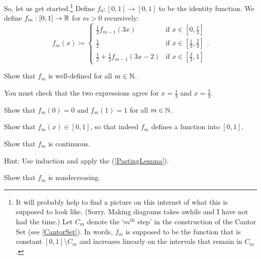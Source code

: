 \begin{exm}
\begin{savenotes}
So, let us get started.\footnote{It will probably help to find a picture on this internet of what this is supposed to look like.  (Sorry.  Making diagrams takes awhile and I have not had the time.)  Let $C_m$ denote the `$m^{\text{th}}$ step' in the construction of the Cantor Set (see \cref{CantorSet}).  In words, $f_m$ is supposed to be the function that is constant $[0,1]\setminus C_m$ and increases linearly on the intervals that remain in $C_m$.}  Define $f_0:[0,1]\rightarrow [0,1]$ to be the identity function.  We define $f_m:[0,1]\rightarrow \mathbb{R}$ for $m>0$ recursively:
\begin{equation}\label{5.2.22}
f_m(x)\coloneqq \begin{cases}\tfrac{1}{2}f_{m-1}(3x) & \text{if }x\in [0,\tfrac{1}{3}] \\ \tfrac{1}{2} & \text{if }x\in [\tfrac{1}{3},\tfrac{2}{3}] \\ \tfrac{1}{2}+\tfrac{1}{2}f_{m-1}(3x-2) & \text{if }x\in [\tfrac{2}{3},1]\end{cases}.
\end{equation}
\begin{exr}
Show that $f_m$ is well-defined for all $m\in \mathbb{N}$.
\begin{rmk}
You must check that the two expressions agree for $x=\frac{1}{3}$ and $x=\frac{2}{3}$.
\end{rmk}
\end{exr}
\begin{exr}
Show that $f_m(0)=0$ and $f_m(1)=1$ for all $m\in \mathbb{N}$.
\end{exr}
\begin{exr}
Show that $f_m(x)\in [0,1]$, so that indeed $f_m$ defines a function into $[0,1]$.
\end{exr}
\begin{exr}
Show that $f_m$ is continuous.
\begin{rmk}
Hint:  Use induction and apply the  (\cref{PastingLemma}).
\end{rmk}
\end{exr}
\begin{exr}
Show that $f_m$ is nondecreasing.
\end{exr}


\end{savenotes}
\end{exm}
